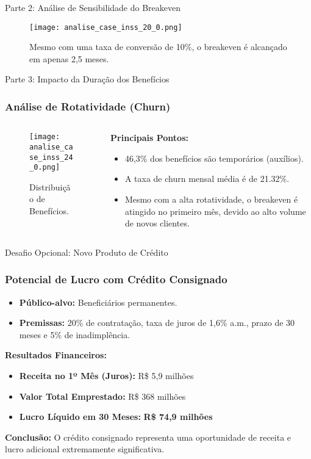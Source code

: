 \documentclass{beamer}
\begin{document}
\begin{frame}{Parte 2: Análise de Sensibilidade do Breakeven}
  \begin{figure}
    \texttt{[image: analise\_case\_inss\_20\_0.png]}
    \caption{Mesmo com uma taxa de conversão de 10\%, o breakeven é alcançado em apenas 2,5 meses.}
  \end{figure}
\end{frame}


\begin{frame}{Parte 3: Impacto da Duração dos Benefícios}
  \frametitle{Análise de Rotatividade (Churn)}
    \begin{columns}
    \begin{column}{0.5\textwidth}
      \begin{figure}
        \texttt{[image: analise\_case\_inss\_24\_0.png]}
        \caption{Distribuição de Benefícios.}
      \end{figure}
    \end{column}
    \begin{column}{0.5\textwidth}
      \textbf{Principais Pontos:}
      \begin{itemize}
        \item 46,3\% dos benefícios são temporários (auxílios).
        \item A taxa de churn mensal média é de 21.32\%.
        \item Mesmo com a alta rotatividade, o breakeven é atingido no primeiro mês, devido ao alto volume de novos clientes.
      \end{itemize}
    \end{column}
  \end{columns}
\end{frame}

\begin{frame}{Desafio Opcional: Novo Produto de Crédito}
  \frametitle{Potencial de Lucro com Crédito Consignado}
  \begin{itemize}
    \item \textbf{Público-alvo:} Beneficiários permanentes.
    \item \textbf{Premissas:} 20\% de contratação, taxa de juros de 1,6\% a.m., prazo de 30 meses e 5\% de inadimplência.
  \end{itemize}
  \vfill
  \textbf{Resultados Financeiros:}
  \begin{itemize}
    \item \textbf{Receita no 1º Mês (Juros):} R\$ 5,9 milhões
    \item \textbf{Valor Total Emprestado:} R\$ 368 milhões
    \item \textbf{Lucro Líquido em 30 Meses:} \textbf{R\$ 74,9 milhões}
  \end{itemize}
  \vfill
  \textbf{Conclusão:} O crédito consignado representa uma oportunidade de receita e lucro adicional extremamente significativa.
\end{frame}
\end{document}
